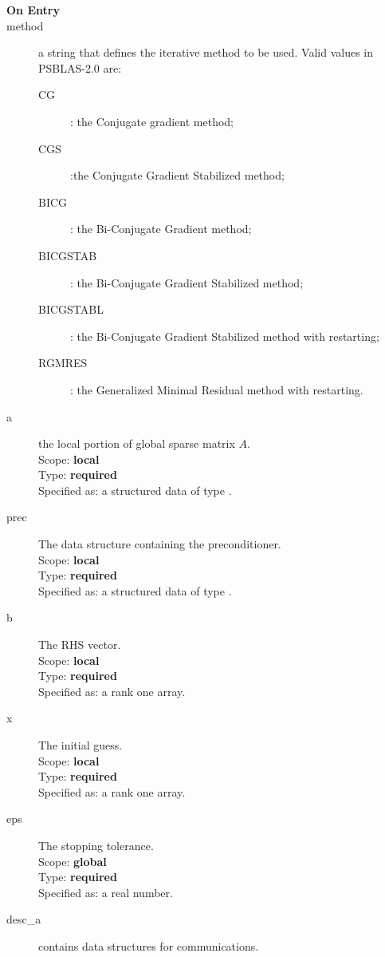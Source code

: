 \begin{description}
\item[\bf On Entry]
\item[method] a string that defines the iterative method to be
  used. Valid values in PSBLAS-2.0 are:
  \begin{description}
  \item[CG]: the Conjugate gradient method;
  \item[CGS]:the Conjugate Gradient Stabilized method;

  \item[BICG]: the Bi-Conjugate Gradient method;
  \item[BICGSTAB]: the Bi-Conjugate Gradient Stabilized method;
  \item[BICGSTABL]: the Bi-Conjugate Gradient Stabilized method with restarting;
  \item[RGMRES]: the Generalized Minimal Residual method with restarting.
  \end{description}
\item[a] the local portion of global sparse matrix
$A$. \\
Scope: {\bf local} \\
Type: {\bf required}\\
Specified as: a structured data of type \spdata.
\item[prec] The data structure containing the preconditioner.\\
Scope: {\bf local} \\
Type: {\bf required}\\
Specified as: a structured data of type \precdata.
\item[b] The RHS vector. \\
Scope: {\bf local} \\
Type: {\bf required}\\
Specified as: a rank one array.
\item[x] The initial guess. \\
Scope: {\bf local} \\
Type: {\bf required}\\
Specified as: a rank one array.
\item[eps] The stopping tolerance. \\
Scope: {\bf global} \\
Type: {\bf required}\\
Specified as: a real number. 
\item[desc\_a] contains data structures for communications.\\

\end{description}
